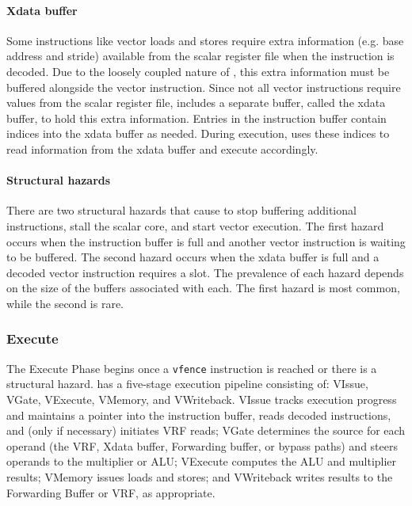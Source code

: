 \paragraph{Xdata buffer}
Some instructions like vector loads and stores require extra information 
(e.g. base address and stride) available from the scalar register file when the instruction is decoded.
%
Due to the loosely coupled nature of \manic, this extra information must be buffered 
alongside the vector instruction.
%
Since not all vector instructions require values from the scalar register file, 
\manic includes a separate buffer, called the xdata buffer, to hold this extra
information.
%
Entries in the instruction buffer contain indices into the xdata buffer as needed.
%
During execution, \manic uses these indices to read information from the xdata buffer and execute accordingly.

\paragraph{Structural hazards}
There are two structural hazards that cause \manic to stop buffering additional
instructions, stall the scalar core, and start vector execution. 
%
The first hazard occurs when the instruction buffer is full and another vector instruction is waiting to be buffered.
%
The second hazard occurs when the xdata buffer is full and a decoded 
vector instruction requires a slot.
%
The prevalence of each hazard depends on the size of the buffers associated with each.
%
The first hazard is most common, while the second is rare.

\subsubsection{Execute}
The Execute Phase begins once a {\tt vfence} instruction is reached or there is a structural hazard.
% 
\manic has a five-stage execution pipeline consisting of: VIssue, VGate, VExecute, VMemory, and VWriteback.
% 
VIssue tracks execution progress and maintains a pointer into the instruction buffer, reads decoded instructions, and (only if necessary) initiates VRF reads;
VGate determines the source for each operand (the VRF, Xdata buffer, Forwarding buffer, or bypass paths) and steers operands to the multiplier or ALU;
VExecute computes the ALU and multiplier results;
VMemory issues loads and stores;
and VWriteback writes results to the Forwarding Buffer or VRF, as appropriate.

